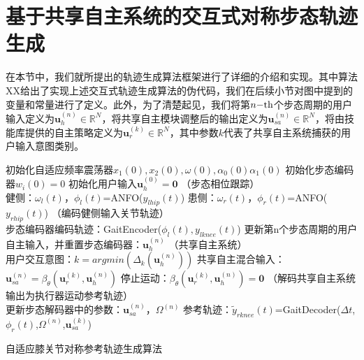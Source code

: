 \section{基于共享自主系统的交互式对称步态轨迹生成}
在本节中，我们就所提出的轨迹生成算法框架进行了详细的介绍和实现。其中算法 XX给出了实现上述交互式轨迹生成算法的伪代码，我们在后续小节对图中提到的变量和常量进行了定义。此外，为了清楚起见，我们将第$n{\rm{ - th}}$个步态周期的用户输入定义为${\pmb{u}}_h^{(n)} \in {\mathbb{R}^N}$，将共享自主模块调整后的输出定义为${\pmb{u}}_{sa}^{(n)} \in {\mathbb{R}^N}$，将由技能库提供的自主策略定义为${\pmb{u}}_r^{(k)} \in {\mathbb{R}^N}$，其中参数$k$代表了共享自主系统捕获的用户输入意图类别。
\begin{algorithm}[h]
  \SetAlgoLined
  初始化自适应频率震荡器$x_1(0),x_2(0),\omega(0),\alpha_0(0)\alpha_1(0)$\;
  初始化步态编码器$w_i(0)=0$\;
  初始化用户输入$\pmb{u}_h^{(0)}=\pmb{0}$\;
  {
    （步态相位跟踪）\\
    健侧：$\omega_l(t)$，$\phi_l(t)$=ANFO($y_{lhip}(t)$) \;
    患侧：$\omega_r(t)$，$\phi_r(t)$=ANFO($y_{rhip}(t)$) \;
    （编码健侧输入关节轨迹）\\
    {
      步态编码器编码轨迹：GaitEncoder($\phi_l(t),y_{lknee}(t)$) \;
    }
    {
      更新第n个步态周期的用户自主输入，并重置步态编码器：$\pmb{u}_h^{(n)}$ 
    }
    （共享自主系统）\\
    {
      {
        用户交互意图：$k=argmin(\Delta_k(\pmb{u}_h^{(n)}))$ \;
        共享自主混合输入：$\pmb{u}_{sa}^{(n)} = \beta_{\theta}(\pmb{u}_r^{(k)}, \pmb{u}_h^{(n)})$\;
      }
    }
    {
      停止运动：$\beta_{\theta}(\pmb{u}_r^{(k)}, \pmb{u}_h^{(n)})=\pmb{0}$
    }
    （解码共享自主系统输出为执行器运动参考轨迹）\\
    {
      更新步态解码器中的参数：$\pmb{u}_{sa}^{(n)}$，$\Omega^{(n)}$\;
    }
    {
      参考轨迹：$\widetilde{y}_{rknee}(t)$=GaitDecoder($\Delta t$, $\phi_r(t)$,$\Omega^{(n)}$,$\pmb{u}_{sa}^{(k)}$) \;
    }
  }
  \caption{自适应膝关节对称参考轨迹生成算法}
  \label{algo:5-1}
\end{algorithm}  

